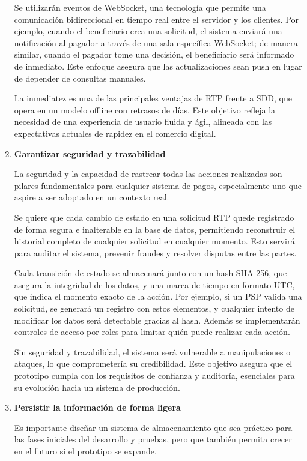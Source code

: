 \begin{enumerate}[label=\textbf{\arabic*}]
    Se utilizarán eventos de WebSocket, una tecnología que permite una comunicación bidireccional en tiempo real entre el servidor y los clientes. Por ejemplo, cuando el beneficiario crea una solicitud, el sistema enviará una notificación al pagador a través de una sala específica WebSocket; de manera similar, cuando el pagador tome una decisión, el beneficiario será informado de inmediato. Este enfoque asegura que las actualizaciones sean push en lugar de depender de consultas manuales.

    La inmediatez es una de las principales ventajas de RTP frente a SDD, que opera en un modelo offline con retrasos de días. Este objetivo refleja la necesidad de una experiencia de usuario fluida y ágil, alineada con las expectativas actuales de rapidez en el comercio digital.
  
  \item \textbf{Garantizar seguridad y trazabilidad}

    La seguridad y la capacidad de rastrear todas las acciones realizadas son pilares fundamentales para cualquier sistema de pagos, especialmente uno que aspire a ser adoptado en un contexto real.

    Se quiere que cada cambio de estado en una solicitud RTP quede registrado de forma segura e inalterable en la base de datos, permitiendo reconstruir el historial completo de cualquier solicitud en cualquier momento. Esto servirá para auditar el sistema, prevenir fraudes y resolver disputas entre las partes.

    Cada transición de estado se almacenará junto con un hash SHA-256, que asegura la integridad de los datos, y una marca de tiempo en formato UTC, que indica el momento exacto de la acción. Por ejemplo, si un PSP valida una solicitud, se generará un registro con estos elementos, y cualquier intento de modificar los datos será detectable gracias al hash. Además se implementarán controles de acceso por roles para limitar quién puede realizar cada acción.

    Sin seguridad y trazabilidad, el sistema será vulnerable a manipulaciones o ataques, lo que comprometería su credibilidad. Este objetivo asegura que el prototipo cumpla con los requisitos de confianza y auditoría, esenciales para su evolución hacia un sistema de producción.
  
  \item \textbf{Persistir la información de forma ligera}

    Es importante diseñar un sistema de almacenamiento que sea práctico para las fases iniciales del desarrollo y pruebas, pero que también permita crecer en el futuro si el prototipo se expande.


\end{enumerate}
